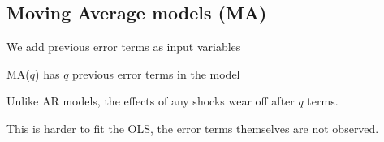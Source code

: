
\subsection{Moving Average models (MA)}

We add previous error terms as input variables

MA(\(q\)) has \(q\) previous error terms in the model

Unlike AR models, the effects of any shocks wear off after \(q\) terms.

This is harder to fit the OLS, the error terms themselves are not observed.


